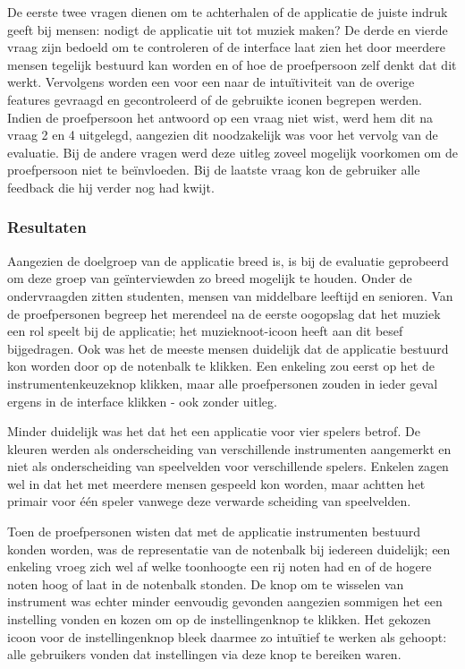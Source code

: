 \documentclass{acm}
\begin{document}
De eerste twee vragen dienen om te achterhalen of de applicatie de juiste indruk geeft bij mensen: nodigt de applicatie uit tot muziek maken? De derde en vierde vraag zijn bedoeld om te controleren of de interface laat zien het door meerdere mensen tegelijk bestuurd kan worden en of hoe de proefpersoon zelf denkt dat dit werkt. Vervolgens worden een voor een naar de intuïtiviteit van de overige features gevraagd en gecontroleerd of de gebruikte iconen begrepen werden. Indien de proefpersoon het antwoord op een vraag niet wist, werd hem dit na vraag 2 en 4 uitgelegd, aangezien dit noodzakelijk was voor het vervolg van de evaluatie. Bij de andere vragen werd deze uitleg zoveel mogelijk voorkomen om de proefpersoon niet te beïnvloeden. Bij de laatste vraag kon de gebruiker alle feedback die hij verder nog had kwijt.

\subsubsection{Resultaten}
Aangezien de doelgroep van de applicatie breed is, is bij de evaluatie geprobeerd om deze groep van geïnterviewden zo breed mogelijk te houden. Onder de ondervraagden zitten studenten, mensen van middelbare leeftijd en senioren. Van de proefpersonen begreep het merendeel na de eerste oogopslag dat het muziek een rol speelt bij de applicatie; het muzieknoot-icoon heeft aan dit besef bijgedragen. Ook was het de meeste mensen duidelijk dat de applicatie bestuurd kon worden door op de notenbalk te klikken. Een enkeling zou eerst op het de instrumentenkeuzeknop klikken, maar alle proefpersonen zouden in ieder geval ergens in de interface klikken - ook zonder uitleg.

Minder duidelijk was het dat het een applicatie voor vier spelers betrof. De kleuren werden als onderscheiding van verschillende instrumenten aangemerkt en niet als onderscheiding van speelvelden voor verschillende spelers. Enkelen zagen wel in dat het met meerdere mensen gespeeld kon worden, maar achtten het primair voor één speler vanwege deze verwarde scheiding van speelvelden.

Toen de proefpersonen wisten dat met de applicatie instrumenten bestuurd konden worden, was de representatie van de notenbalk bij iedereen duidelijk; een enkeling vroeg zich wel af welke toonhoogte een rij noten had en of de hogere noten hoog of laat in de notenbalk stonden. De knop om te wisselen van instrument was echter minder eenvoudig gevonden aangezien sommigen het een instelling vonden en kozen om op de instellingenknop te klikken. Het gekozen icoon voor de instellingenknop bleek daarmee zo intuïtief te werken als gehoopt: alle gebruikers vonden dat instellingen via deze knop te bereiken waren.
\end{document}
